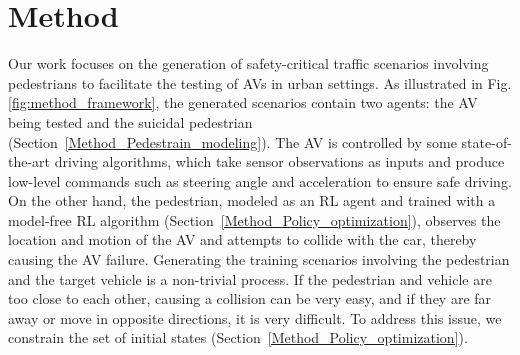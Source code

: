 \documentclass[letterpaper, 10 pt, conference]{ieeeconf}
\begin{document}
\section{Method}

Our work focuses on the generation of safety-critical traffic scenarios involving pedestrians to facilitate the testing of AVs in urban settings. As illustrated in Fig. \ref{fig:method_framework}, the generated scenarios contain two agents: the AV being tested and the suicidal pedestrian (Section~\ref{Method_Pedestrain_modeling}). The AV is controlled by some state-of-the-art driving algorithms, which take sensor observations as inputs and produce low-level commands such as steering angle and acceleration to ensure safe driving. On the other hand, the pedestrian, modeled as an RL agent and trained with a model-free RL algorithm (Section~\ref{Method_Policy_optimization}), observes the location and motion of the AV and attempts to collide with the car, thereby causing the AV failure. Generating the training scenarios involving the pedestrian and the target vehicle is a non-trivial process. If the pedestrian and vehicle are too close to each other, causing a collision can be very easy, and if they are far away or move in opposite directions, it is very difficult. To address this issue, we constrain the set of initial states (Section~\ref{Method_Policy_optimization}).%


\end{document}
